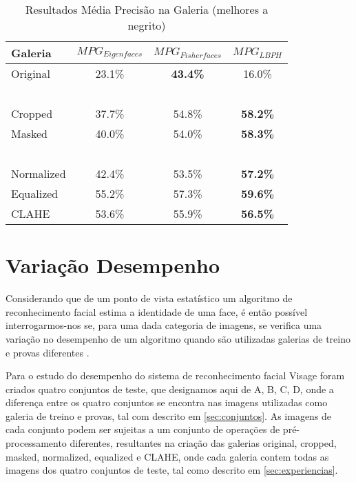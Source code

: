 \begin{center}
\begin{table}
    \begin{center}
    \caption{Resultados Média Precisão na Galeria (melhores a negrito)}
    \begin{tabular}{l|ccc}
    Galeria    & $MPG_{Eigenfaces}$ & $MPG_{Fisherfaces}$ & $MPG_{LBPH}$ \\ 
    \hline\hline
    Original   & 23.1\%          & \textbf{43.4\%}  & 16.0\%             \\
    ~ \\
    Cropped    & 37.7\%          & 54.8\%           & \textbf{58.2\%}    \\
    Masked     & 40.0\%          & 54.0\%           & \textbf{58.3\%}    \\
    ~ \\
    Normalized & 42.4\%          & 53.5\%           & \textbf{57.2\%}    \\
    Equalized  & 55.2\%          & 57.3\%           & \textbf{59.6\%}    \\
    CLAHE      & 53.6\%          & 55.9\%           & \textbf{56.5\%}    \\
    \hline\hline
    \end{tabular}
    \label{tab:resultadosprecicao}
    \end{center}
\end{table}
\end{center}


\section{Variação Desempenho} \label{sec:variacaodesempenho}
Considerando que de um ponto de vista estatístico um algoritmo de reconhecimento facial estima a identidade de uma face, é então possível interrogarmos-nos se, para uma dada categoria de imagens, se verifica uma variação no desempenho de um algoritmo quando são utilizadas galerias de treino e provas diferentes \cite{Phillips2000}.

Para o estudo do desempenho do sistema de reconhecimento facial Visage foram criados quatro conjuntos de teste, que designamos aqui de A, B, C, D, onde a diferença entre os quatro conjuntos se encontra nas imagens utilizadas como galeria de treino e provas, tal com descrito em \ref{sec:conjuntos}. As imagens de cada conjunto podem ser sujeitas a um conjunto de operações de pré-processamento diferentes, resultantes na criação das galerias original, cropped, masked, normalized, equalized e CLAHE, onde cada galeria contem todas as imagens dos quatro conjuntos de teste, tal como descrito em \ref{sec:experiencias}.

